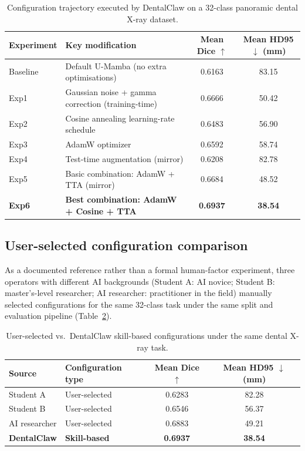 \documentclass[final,5p,times,twocolumn]{elsarticle}
\begin{document}
\begin{table}[!ht]
\centering
\small
\caption{Configuration trajectory executed by DentalClaw on a 32-class panoramic dental X-ray dataset.}
\label{tab:supp_tdd_trajectory}
\begin{tabular}{l l c c}
\toprule
Experiment & Key modification & Mean Dice $\uparrow$ & Mean HD95 $\downarrow$ (mm) \\
\midrule
Baseline & Default U-Mamba (no extra optimisations) & 0.6163 & 83.15 \\
Exp1 & Gaussian noise + gamma correction (training-time) & 0.6666 & 50.42 \\
Exp2 & Cosine annealing learning-rate schedule & 0.6483 & 56.90 \\
Exp3 & AdamW optimizer & 0.6592 & 58.74 \\
Exp4 & Test-time augmentation (mirror) & 0.6208 & 82.78 \\
Exp5 & Basic combination: AdamW + TTA (mirror) & 0.6684 & 48.52 \\
\textbf{Exp6} & \textbf{Best combination: AdamW + Cosine + TTA} & \textbf{0.6937} & \textbf{38.54} \\
\bottomrule
\end{tabular}
\end{table}

\subsection{User-selected configuration comparison}

As a documented reference rather than a formal human-factor experiment, three operators with different AI backgrounds (Student A: AI novice; Student B: master's-level researcher; AI researcher: practitioner in the field) manually selected configurations for the same 32-class task under the same split and evaluation pipeline (Table~\ref{tab:supp_user_comparison}).

\begin{table}[!ht]
\centering
\small
\caption{User-selected vs.\ DentalClaw skill-based configurations under the same dental X-ray task.}
\label{tab:supp_user_comparison}
\begin{tabular}{l l c c}
\toprule
Source & Configuration type & Mean Dice $\uparrow$ & Mean HD95 $\downarrow$ (mm) \\
\midrule
Student A & User-selected & 0.6283 & 82.28 \\
Student B & User-selected & 0.6546 & 56.37 \\
AI researcher & User-selected & 0.6883 & 49.21 \\
\textbf{DentalClaw} & \textbf{Skill-based} & \textbf{0.6937} & \textbf{38.54} \\
\bottomrule
\end{tabular}
\end{table}
\end{document}
